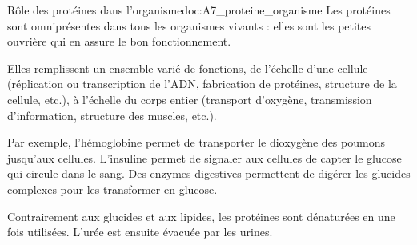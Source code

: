 \begin{doc}{Rôle des protéines dans l'organisme}{doc:A7_proteine_organisme}
  Les protéines sont omniprésentes dans tous les organismes vivants : elles sont les petites ouvrière qui en assure le bon fonctionnement.
  
  Elles remplissent un ensemble varié de fonctions, de l'échelle d'une cellule (réplication ou transcription de l'ADN, fabrication de protéines, structure de la cellule, etc.), à l'échelle du corps entier (transport d'oxygène, transmission d'information, structure des muscles, etc.).

  Par exemple, l'hémoglobine permet de transporter le dioxygène des poumons jusqu'aux cellules.
  L'insuline permet de signaler aux cellules de capter le glucose qui circule dans le sang.
  Des enzymes digestives permettent de digérer les glucides complexes pour les transformer en glucose.

  Contrairement aux glucides et aux lipides, les protéines sont dénaturées en  une fois utilisées.
  L'urée est ensuite évacuée par les urines.
\end{doc}



